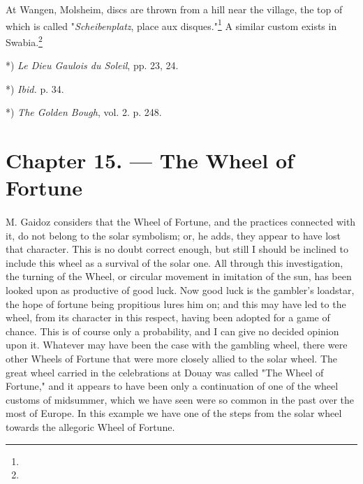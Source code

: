 \documentclass[a4paper, 11pt, oneside, polutonikogreek, english]{article}
\begin{document}
At Wangen, Molsheim, discs are thrown from a hill near the village, the top of which is called "\emph{Scheibenplatz}, place aux disques."\footnote{} A similar custom exists in Swabia.\footnote{}

*) \emph{Le Dieu Gaulois du Soleil}, pp. 23, 24.

*) \emph{Ibid.} p. 34.

*) \emph{The Golden Bough}, vol. 2. p. 248.
\clearpage
\section{Chapter 15. --- The Wheel of Fortune}
\paragraph{}
M. Gaidoz considers that the Wheel of Fortune, and the practices connected with it, do not belong to the solar symbolism; or, he adds, they appear to have lost that character. This is no doubt correct enough, but still I should be inclined to include this wheel as a survival of the solar one. All through this investigation, the turning of the Wheel, or circular movement in imitation of the sun, has been looked upon as productive of good luck. Now good luck is the gambler's loadstar, the hope of fortune being propitious lures him on; and this may have led to the wheel, from its character in this respect, having been adopted for a game of chance. This is of course only a probability, and I can give no decided opinion upon it. Whatever may have been the case with the gambling wheel, there were other Wheels of Fortune that were more closely allied to the solar wheel. The great wheel carried in the celebrations at Douay was called "The Wheel of Fortune," and it appears to have been only a continuation of one of the wheel customs of midsummer, which we have seen were so common in the past over the most of Europe. In this example we have one of the steps from the solar wheel towards the allegoric Wheel of Fortune.
\end{document}
